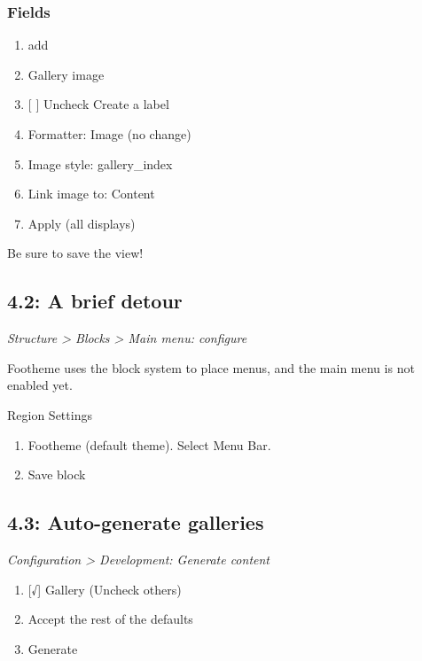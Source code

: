 \documentclass[letterpaper,10pt,english]{sphinxmanual}
\begin{document}
\subsubsection{Fields}
\label{slides:fields}\begin{enumerate}
\item {} 
add

\item {} 
Gallery image

\item {} 
{[} {]} Uncheck Create a label

\item {} 
Formatter: Image (no change)

\item {} 
Image style: gallery\_index

\item {} 
Link image to: Content

\item {} 
Apply (all displays)

\end{enumerate}

Be sure to save the view!


\subsection{4.2: A brief detour}
\label{slides:a-brief-detour}
\emph{Structure \textgreater{} Blocks \textgreater{} Main menu: configure}

Footheme uses the block system to place menus, and the main menu is not enabled yet.

Region Settings
\begin{enumerate}
\item {} 
Footheme (default theme). Select Menu Bar.

\item {} 
Save block

\end{enumerate}


\subsection{4.3: Auto-generate galleries}
\label{slides:auto-generate-galleries}
\emph{Configuration \textgreater{} Development: Generate content}
\begin{enumerate}
\item {} 
{[}√{]} Gallery (Uncheck others)

\item {} 
Accept the rest of the defaults

\item {} 
Generate

\end{enumerate}
\end{document}
